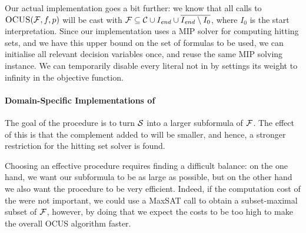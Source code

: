 Our actual implementation goes a bit further: we know that all calls to $\textsc{OCUS}(\mathcal{F} ,f,p)$ will be cast with $\mathcal{F}  \subseteq \mathcal{C}\cup I_\mathit{end}  \cup \overline{I_\mathit{end}  \setminus I_0}$, where $I_0$ is the start interpretation. Since our implementation uses a MIP solver for computing hitting sets, and we have this upper bound on the set of formulas to be used, we can initialise all relevant decision variables once, and reuse the same MIP solving instance. We can temporarily disable every literal not in \formula by settings its weight to infinity in the objective function.




\paragraph{Domain-Specific Implementations of \grow} \label{para:domainspecificgrow}

The goal of the \grow procedure is to turn $\mathcal{S}$ into a larger subformula of $\mathcal{F} $. The effect of this is that the complement added to \setstohit will be smaller, and hence, a stronger restriction for the hitting set solver is found.  

Choosing an effective \grow procedure requires finding a difficult balance: on the one hand, we want our subformula to be as large as possible, %
but on the other hand we also want the procedure to be very efficient. 
Indeed, if the computation cost of the \grow were not important, we could use a MaxSAT call to obtain a subset-maximal subset of $\mathcal{F} $, however, by doing that we expect the \grow costs to be too high to make the overall OCUS algorithm faster. 

